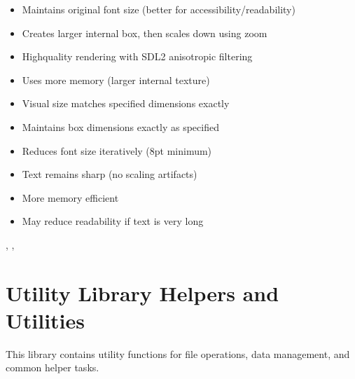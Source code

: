 \documentclass[letterpaper,10pt,english]{sphinxmanual}
\begin{document}
\sphinxAtStartPar
{}

\sphinxAtStartPar
{}
\begin{itemize}
\item {} 
\sphinxAtStartPar
Maintains original font size (better for accessibility/readability)

\item {} 
\sphinxAtStartPar
Creates larger internal box, then scales down using zoom

\item {} 
\sphinxAtStartPar
High\sphinxhyphen{}quality rendering with SDL2 anisotropic filtering

\item {} 
\sphinxAtStartPar
Uses more memory (larger internal texture)

\item {} 
\sphinxAtStartPar
Visual size matches specified dimensions exactly

\end{itemize}

\sphinxAtStartPar
{}
\begin{itemize}
\item {} 
\sphinxAtStartPar
Maintains box dimensions exactly as specified

\item {} 
\sphinxAtStartPar
Reduces font size iteratively (8pt minimum)

\item {} 
\sphinxAtStartPar
Text remains sharp (no scaling artifacts)

\item {} 
\sphinxAtStartPar
More memory efficient

\item {} 
\sphinxAtStartPar
May reduce readability if text is very long

\end{itemize}

\sphinxAtStartPar
{}

\sphinxAtStartPar
{}, , 

\sphinxstepscope


\section{Utility Library \sphinxhyphen{} Helpers and Utilities}
\label{\detokenize{reference/utility:utility-library-helpers-and-utilities}}\label{\detokenize{reference/utility::doc}}
\sphinxAtStartPar
This library contains utility functions for file operations, data management, and common helper tasks.
\end{document}
